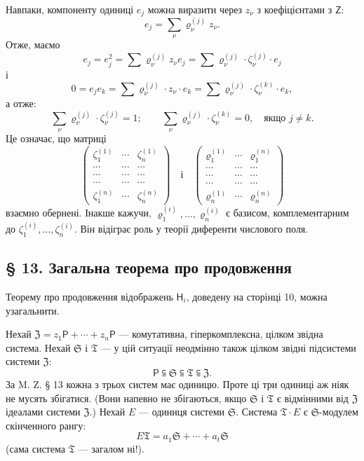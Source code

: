 \documentclass[11pt]{article}
\begin{document}
Навпаки, компоненту одиниці \(e_j\) можна виразити через \(z_\nu\) з коефіцієнтами з \(\mathsf Z\):
\[
e_j=\sum_\nu \varrho_\nu^{(j)}z_\nu .
\]
Отже, маємо
\[
e_j=e_j^2=\sum \varrho_\nu^{(j)}z_\nu e_j
=\sum \varrho_\nu^{(j)}\cdot\zeta_\nu^{(j)}\cdot e_j
\]
і
\[
0=e_je_k=\sum \varrho_\nu^{(j)}\cdot z_\nu\cdot e_k
=\sum \varrho_\nu^{(j)}\cdot\zeta_\nu^{(k)}\cdot e_k,
\]
а отже:
\[
\sum_\nu \varrho_\nu^{(j)}\cdot\zeta_\nu^{(j)}=1;
\qquad
\sum_\nu \varrho_\nu^{(j)}\cdot\zeta_\nu^{(k)}=0,\quad
\text{якщо } j\ne k.
\]
Це означає, що матриці
\[
\begin{pmatrix}
\zeta_1^{(1)} & \cdots & \zeta_n^{(1)}\\
\cdots & \cdots & \cdots\\
\cdots & \cdots & \cdots\\
\cdots & \cdots & \cdots\\
\zeta_1^{(n)} & \cdots & \zeta_n^{(n)}
\end{pmatrix}
\quad\text{і}\quad
\begin{pmatrix}
\varrho_1^{(1)} & \cdots & \varrho_1^{(n)}\\
\cdots & \cdots & \cdots\\
\cdots & \cdots & \cdots\\
\cdots & \cdots & \cdots\\
\varrho_n^{(1)} & \cdots & \varrho_n^{(n)}
\end{pmatrix}
\]
взаємно обернені. Інакше кажучи, \(\varrho_1^{(i)},\ldots,\varrho_n^{(i)}\) є базисом, комплементарним до \(\zeta_1^{(i)},\ldots,\zeta_n^{(i)}\). Він відіграє роль у теорії диференти числового поля.

\subsection*{§ 13. Загальна теорема про продовження}\label{der-allgemeine-fortsetzungssatz}

Теорему про продовження відображень \(\mathsf{H}_i\), доведену на сторінці 10, можна узагальнити.

Нехай \(\mathfrak Z=z_1\mathsf P+\cdots+z_n\mathsf P\) --- комутативна, гіперкомплексна, цілком звідна система. Нехай \(\mathfrak S\) і \(\mathfrak T\) --- у цій ситуації неодмінно також цілком звідні підсистеми системи \(\mathfrak Z\):
\[
\mathsf P\subseteqq\mathfrak S\subseteqq\mathfrak T\subseteqq\mathfrak Z .
\]
За M. Z. § 13 кожна з трьох систем має одиницю. Проте ці три одиниці аж ніяк не мусять збігатися. (Вони напевно не збігаються, якщо \(\mathfrak S\) і \(\mathfrak T\) є відмінними від \(\mathfrak Z\) ідеалами системи \(\mathfrak Z\).) Нехай \(E\) --- одиниця системи \(\mathfrak S\). Система \(\mathfrak T\cdot E\) є \(\mathfrak S\)-модулем скінченного рангу:
\[
E\mathfrak T=a_1\mathfrak S+\cdots+a_t\mathfrak S
\]
(сама система \(\mathfrak T\) --- загалом ні!).
\end{document}

